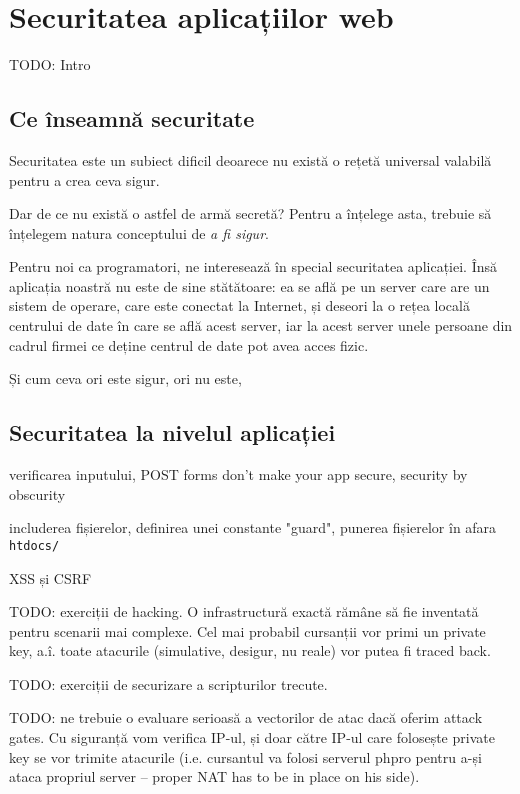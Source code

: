 \chapter{Securitatea aplicațiilor web}

\begin{chapsummary}
TODO: Intro
\end{chapsummary}

\section{Ce înseamnă securitate}
Securitatea este un subiect dificil deoarece nu există o rețetă
universal valabilă pentru a crea ceva sigur.

Dar de ce nu există
o astfel de armă secretă?
Pentru a înțelege asta, trebuie să înțelegem natura conceptului de
\textit{a fi sigur}. 

Pentru noi ca programatori, ne interesează în special securitatea
aplicației. Însă aplicația noastră nu este de sine stătătoare: ea
se află pe un server care are un sistem de operare, care este conectat
la Internet, și deseori la o rețea locală centrului de date în
care se află acest server, iar la acest server unele persoane
din cadrul firmei ce deține centrul de date pot avea acces fizic.

Și cum ceva ori este sigur, ori nu este, 
\section{Securitatea la nivelul aplicației}
verificarea inputului, POST forms don't make your app secure,
security by obscurity

includerea fișierelor, definirea unei constante "guard",
punerea fișierelor în afara \texttt{htdocs/}

XSS și CSRF


TODO: exerciții de hacking. O infrastructură exactă răm\^ane să fie inventată
pentru scenarii mai complexe. Cel mai probabil cursanții vor primi un
{\glqq}private key{\grqq}, a.\^i. toate atacurile (simulative, desigur, nu reale)
vor putea fi traced back.

TODO: exerciții de securizare a scripturilor trecute.

TODO: ne trebuie o evaluare serioasă a vectorilor de atac dacă oferim
{\glqq}attack gates{\grqq}. Cu siguranță vom verifica IP-ul, și doar către
IP-ul care folosește private key se vor trimite atacurile (i.e. cursantul
va folosi serverul phpro pentru a-și ataca propriul server -- proper NAT has to be
in place on his side).
